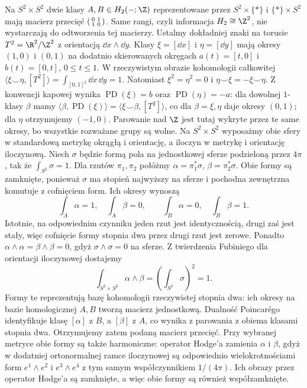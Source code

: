 \begin{przyklad}
\label{prz:pd-torus-sfery-21}
Na $S^2\times S^2$ dwie
klasy $A,B\in H_2(-;\Z)$
reprezentowane przez
$S^2\times\{*\}$ i
$\{*\}\times S^2$
mają macierz przecięć
$\begin{psmallmatrix}0&1\\1&0\end{psmallmatrix}$.
Same rangi, czyli informacja $H_2\cong\Z^2$,
nie wystarczają do odtworzenia
tej macierzy.
Ustalmy dokładniej znaki na torusie
$T^2=\R^2/\Z^2$ z orientacją $\dd x\wedge\dd y$.
Klasy $\xi=[\dd x]$ i $\eta=[\dd y]$ mają okresy
$(1,0)$ i $(0,1)$ na dodatnio skierowanych okręgach
$a(t)=[t,0]$ i $b(t)=[0,t]$, $0\leq t\leq1$.
W rzeczywistym obrazie kohomologii całkowitej
$\langle\xi\smile\eta,[T^2]\rangle
=\int_{[0,1]^2}\dd x\,\dd y=1$.
Natomiast $\xi^2=\eta^2=0$ i
$\eta\smile\xi=-\xi\smile\eta$.
Z konwencji kapowej wynika
$\operatorname{PD}(\xi)=b$ oraz $\operatorname{PD}(\eta)=-a$:
dla dowolnej $1$-klasy $\beta$ mamy
$\langle\beta,\operatorname{PD}(\xi)\rangle
=\langle\xi\smile\beta,[T^2]\rangle$,
co dla $\beta=\xi,\eta$ daje okresy $(0,1)$; dla $\eta$
otrzymujemy $(-1,0)$.
Parowanie nad $\Z$ jest tutaj wykryte przez te same okresy,
bo wszystkie rozważane grupy są wolne.
Na $S^2\times S^2$ wyposażmy obie sfery w standardową
metrykę okrągłą i orientację, a iloczyn w metrykę i
orientację iloczynową. Niech $\sigma$ będzie formą pola
na jednostkowej sferze podzieloną przez $4\pi$, tak że
$\int_{S^2}\sigma=1$. Dla rzutów $\pi_1,\pi_2$ połóżmy
$\alpha=\pi_1^*\sigma$, $\beta=\pi_2^*\sigma$.
Obie formy są zamknięte, ponieważ $\sigma$ ma stopień
najwyższy na sferze i pochodna zewnętrzna komutuje
z cofnięciem form. Ich okresy wynoszą
\[
 \int_A\alpha=1,\quad \int_A\beta=0,\qquad
 \int_B\alpha=0,\quad \int_B\beta=1.
\]
Istotnie, na odpowiednim czynniku jeden rzut jest
identycznością, drugi zaś jest stały, więc cofnięcie
formy stopnia dwa przez drugi rzut jest zerowe.
Ponadto $\alpha\wedge\alpha=\beta\wedge\beta=0$,
gdyż $\sigma\wedge\sigma=0$ na sferze.
Z twierdzenia Fubiniego dla orientacji iloczynowej
dostajemy
\[
 \int_{S^2\times S^2}\alpha\wedge\beta
 =\left(\int_{S^2}\sigma\right)^2=1.
\]
Formy te reprezentują bazę kohomologii rzeczywistej
stopnia dwa: ich okresy na bazie homologicznej $A,B$
tworzą macierz jednostkową. Dualność Poincarégo
identyfikuje klasę $[\alpha]$ z $B$, a $[\beta]$ z $A$,
co wynika z parowania z obiema klasami stopnia dwa.
Otrzymujemy zatem podaną macierz przecięć.
Przy wybranej metryce obie formy są także harmoniczne:
operator Hodge'a zamienia $\alpha$ i $\beta$, gdyż
w dodatniej ortonormalnej ramce iloczynowej są
odpowiednio wielokrotnościami form $e^1\wedge e^2$
i $e^3\wedge e^4$ z tym samym współczynnikiem
$1/(4\pi)$. Ich obrazy przez operator Hodge'a są
zamknięte, a więc obie formy są również współzamknięte.
\end{przyklad}

